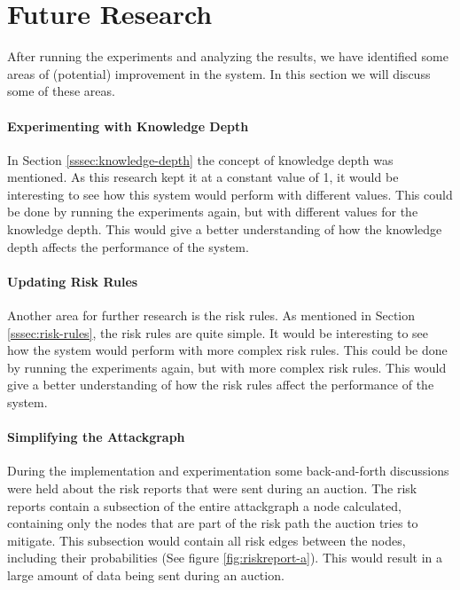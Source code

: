 \section{Future Research}
\label{sec:future-research}

After running the experiments and analyzing the results, we have identified some areas of (potential) improvement in the system. In this section we will discuss some of these areas.

\paragraph{Experimenting with Knowledge Depth}
In Section \ref{sssec:knowledge-depth} the concept of knowledge depth was mentioned. As this research kept it at a constant value of 1, it would be interesting to see how this system would perform with different values. This could be done by running the experiments again, but with different values for the knowledge depth. This would give a better understanding of how the knowledge depth affects the performance of the system.

\paragraph{Updating Risk Rules}
Another area for further research is the risk rules. As mentioned in Section \ref{sssec:risk-rules}, the risk rules are quite simple. It would be interesting to see how the system would perform with more complex risk rules. This could be done by running the experiments again, but with more complex risk rules. This would give a better understanding of how the risk rules affect the performance of the system. 

\paragraph{Simplifying the Attackgraph}
During the implementation and experimentation some back-and-forth discussions were held about the risk reports that were sent during an auction. The risk reports contain a subsection of the entire attackgraph a node calculated, containing only the nodes that are part of the risk path the auction tries to mitigate. This subsection would contain all risk edges between the nodes, including their probabilities (See figure \ref{fig:riskreport-a}). This would result in a large amount of data being sent during an auction. 

